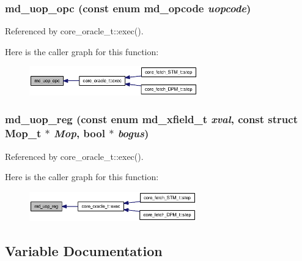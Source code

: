 \subsubsection[{md\_\-uop\_\-opc}]{ md\_\-uop\_\-opc (const enum {\bf md\_\-opcode} {\em uopcode})}\label{machine_8h_9682311d5eea29d63f16e67e41be6053}




Referenced by core\_\-oracle\_\-t::exec().

Here is the caller graph for this function:\nopagebreak
\begin{figure}[H]
\begin{center}
\leavevmode
\includegraphics[width=206pt]{machine_8h_9682311d5eea29d63f16e67e41be6053_icgraph}
\end{center}
\end{figure}
\subsubsection[{md\_\-uop\_\-reg}]{ md\_\-uop\_\-reg (const enum {\bf md\_\-xfield\_\-t} {\em xval}, \/  const struct {\bf Mop\_\-t} $\ast$ {\em Mop}, \/  bool $\ast$ {\em bogus})}\label{machine_8h_85959b31a96164d804447c37faa100a5}




Referenced by core\_\-oracle\_\-t::exec().

Here is the caller graph for this function:\nopagebreak
\begin{figure}[H]
\begin{center}
\leavevmode
\includegraphics[width=205pt]{machine_8h_85959b31a96164d804447c37faa100a5_icgraph}
\end{center}
\end{figure}


\subsection{Variable Documentation}
